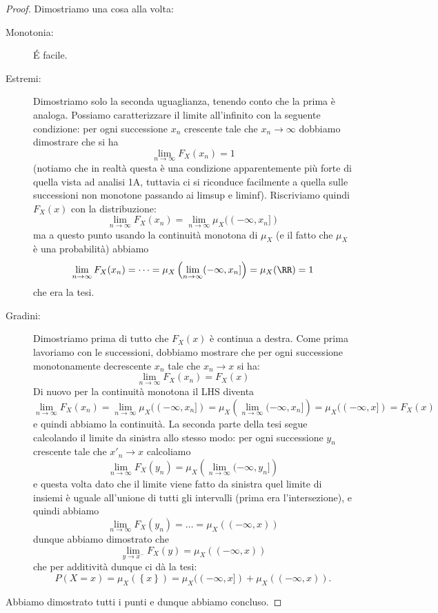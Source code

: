 \documentclass[11pt]{scrartcl}
\begin{document}
	\begin{proof}
		Dimostriamo una cosa alla volta:
		\begin{description}
			\item[Monotonia:] \'E facile.
			\item[Estremi:] Dimostriamo solo la seconda uguaglianza, tenendo conto che la prima è analoga. Possiamo caratterizzare il limite all'infinito con la seguente condizione: per ogni successione $x_n$ crescente tale che $x_n\to \infty$ dobbiamo dimostrare che si ha
			$$\lim_{n\to\infty}F_X(x_n)=1$$
			(notiamo che in realtà questa è una condizione apparentemente più forte di quella vista ad analisi 1A, tuttavia ci si riconduce facilmente a quella sulle successioni non monotone passando ai limsup e liminf). Riscriviamo quindi $F_X(x)$ con la distribuzione:
			$$\lim_{n\to\infty}F_X(x_n)=\lim_{n\to\infty}\mu_X((-\infty,x_n])$$
			ma a questo punto usando la continuità monotona di $\mu_X$ (e il fatto che $\mu_X$ è una probabilità) abbiamo
			$$\lim_{n\to\infty}F_X(x_n)=\dots=\mu_X\left(\lim_{n\to\infty}(-\infty,x_n]\right)=\mu_X(\RR)=1$$
			che era la tesi.
			\item[Gradini:] Dimostriamo prima di tutto che $F_X(x)$ è continua a destra. Come prima lavoriamo con le successioni, dobbiamo mostrare che per ogni successione monotonamente decrescente $x_n$ tale che $x_n\to x$ si ha:
			$$\lim_{n\to\infty}F_X(x_n)=F_X(x)$$
			Di nuovo per la continuità monotona il LHS diventa
			$$\lim_{n\to\infty}F_X(x_n)=\lim_{n\to\infty}\mu_X((-\infty,x_n])=\mu_X\left(\lim_{n\to\infty}(-\infty,x_n]\right)=\mu_X((-\infty,x])=F_X(x)$$
			e quindi abbiamo la continuità. La seconda parte della tesi segue calcolando il limite da sinistra allo stesso modo: per ogni successione $y_n$ crescente tale che $x'_n\to x$ calcoliamo
			$$\lim_{n\to\infty}F_X(y_n)=\mu_X\left(\lim_{n\to\infty}(-\infty,y_n]\right)$$
			e questa volta dato che il limite viene fatto da sinistra quel limite di insiemi è uguale all'unione di tutti gli intervalli (prima era l'intersezione), e quindi abbiamo
			$$\lim_{n\to\infty}F_X(y_n)=\dots=\mu_X((-\infty,x))$$
			dunque abbiamo dimostrato che 
			$$\lim_{y\to x^-}F_X(y)=\mu_X((-\infty,x))$$
			che per additività dunque ci dà la tesi:
			$$P(X=x)=\mu_X(\left\{x\right\})=\mu_X((-\infty,x])+\mu_X((-\infty,x)).$$ 
		\end{description}
		Abbiamo dimostrato tutti i punti e dunque abbiamo concluso.
	\end{proof}
	
\end{document}
